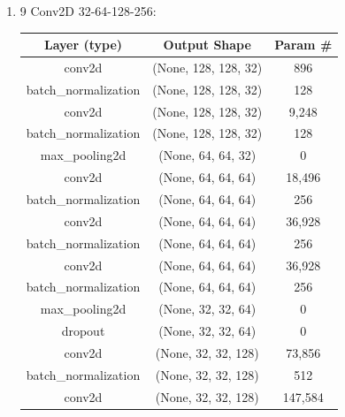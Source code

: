 \documentclass{article}
\begin{document}
\begin{enumerate}
            \item 9 Conv2D 32-64-128-256:
                \begin{table}[h!]
                    \centering
                    \begin{tabular}{|c|c|c|}
                        \hline
                        Layer (type) & Output Shape & Param \# \\
                        \hline
                        conv2d & (None, 128, 128, 32) & 896 \\
                        \hline
                        batch\_normalization & (None, 128, 128, 32) & 128 \\
                        \hline
                        conv2d & (None, 128, 128, 32) & 9,248 \\
                        \hline
                        batch\_normalization & (None, 128, 128, 32) & 128 \\
                        \hline
                        max\_pooling2d & (None, 64, 64, 32) & 0 \\
                        \hline
                        conv2d & (None, 64, 64, 64) & 18,496 \\
                        \hline
                        batch\_normalization & (None, 64, 64, 64) & 256 \\
                        \hline
                        conv2d & (None, 64, 64, 64) & 36,928 \\
                        \hline
                        batch\_normalization & (None, 64, 64, 64) & 256 \\
                        \hline
                        conv2d & (None, 64, 64, 64) & 36,928 \\
                        \hline
                        batch\_normalization & (None, 64, 64, 64) & 256 \\
                        \hline
                        max\_pooling2d & (None, 32, 32, 64) & 0 \\
                        \hline
                        dropout & (None, 32, 32, 64) & 0 \\
                        \hline
                        conv2d & (None, 32, 32, 128) & 73,856 \\
                        \hline
                        batch\_normalization & (None, 32, 32, 128) & 512 \\
                        \hline
                        conv2d & (None, 32, 32, 128) & 147,584 \\

\end{tabular}
\end{table}
\end{enumerate}
\end{document}
